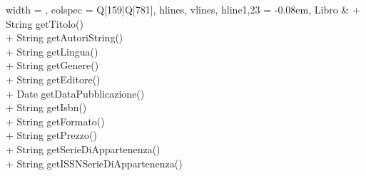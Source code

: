 \begin{longtblr}[
    label = none,
    entry = none,
  ]{
    width = \linewidth,
    colspec = {Q[159]Q[781]},
    hlines,
    vlines,
    hline{1,23} = {-}{0.08em},
  }
  Libro                  & {+ String getTitolo()\\+ String getAutoriString()\\+ String getLingua()\\+ String getGenere()\\+ String getEditore()\\+ Date getDataPubblicazione()\\+ String getIsbn()\\+ String getFormato()\\+ String getPrezzo()\\+ String getSerieDiAppartenenza()\\+ String getISSNSerieDiAppartenenza()}                                                                                                                                                                                                                                                                                                                                                                                                                                                                                                                                                                                                                                                                                                                                                                                                                                                                                                                                                                                                                                                                                                                                                                                                                                                                                                                                                                                                                                                                                                                                                                                                 \\

\end{longtblr}
